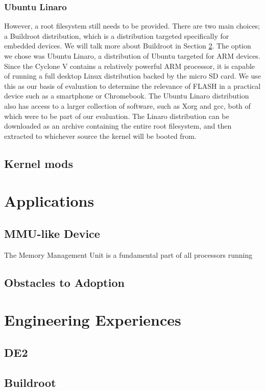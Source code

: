 \documentclass{sig-alternate-10pt}
\begin{document}
\subsubsection{Ubuntu Linaro}
However, a root filesystem still needs to be provided. There are two main choices; a Buildroot distribution, which is a distribution targeted specifically for embedded devices. We will talk more about Buildroot in Section \ref{sec:eng_exp}. The option we chose was Ubuntu Linaro, a distribution of Ubuntu targeted for ARM devices. Since the Cyclone V contains a relatively powerful ARM processor, it is capable of running a full desktop Linux distribution backed by the micro SD card. We use this as our basis of evaluation to determine the relevance of FLASH in a practical device such as a smartphone or Chromebook. The Ubuntu Linaro distribution also has access to a larger collection of software, such as Xorg and gcc, both of which were to be part of our evaluation. The Linaro distribution can be downloaded as an archive containing the entire root filesystem, and then extracted to whichever source the kernel will be booted from.

\subsection{Kernel mods}
\lipsum[1-3]


\section{Applications}
\label{sec:apps}
\subsection{MMU-like Device}
The Memory Management Unit is a fundamental part of all processors running

\subsection{Obstacles to Adoption}


\section{Engineering Experiences}
\label{sec:eng_exp}
\subsection{DE2}
\subsection{Buildroot}
\end{document}
